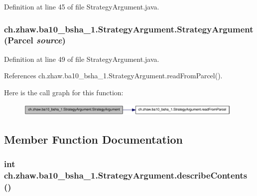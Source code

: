 Definition at line 45 of file StrategyArgument.java.\hypertarget{classch_1_1zhaw_1_1ba10__bsha__1_1_1StrategyArgument_a168a3cb11b9268aeeb2da1a0beca2e48}{
\subsubsection[{StrategyArgument}]{\setlength{\rightskip}{0pt plus 5cm}ch.zhaw.ba10\_\-bsha\_\-1.StrategyArgument.StrategyArgument (Parcel {\em source})}}
\label{classch_1_1zhaw_1_1ba10__bsha__1_1_1StrategyArgument_a168a3cb11b9268aeeb2da1a0beca2e48}


Definition at line 49 of file StrategyArgument.java.

References ch.zhaw.ba10\_\-bsha\_\-1.StrategyArgument.readFromParcel().

Here is the call graph for this function:\nopagebreak
\begin{figure}[H]
\begin{center}
\leavevmode
\includegraphics[width=311pt]{classch_1_1zhaw_1_1ba10__bsha__1_1_1StrategyArgument_a168a3cb11b9268aeeb2da1a0beca2e48_cgraph}
\end{center}
\end{figure}


\subsection{Member Function Documentation}
\hypertarget{classch_1_1zhaw_1_1ba10__bsha__1_1_1StrategyArgument_a9512363209aaf07138c49d9f5ad4e544}{
\subsubsection[{describeContents}]{\setlength{\rightskip}{0pt plus 5cm}int ch.zhaw.ba10\_\-bsha\_\-1.StrategyArgument.describeContents ()}}
\label{classch_1_1zhaw_1_1ba10__bsha__1_1_1StrategyArgument_a9512363209aaf07138c49d9f5ad4e544}


